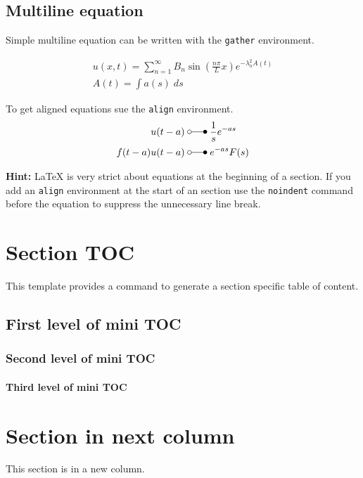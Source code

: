\documentclass[\fontheight]{extarticle}
\begin{document}
\begin{multicols*}{3}
    \subsection{Multiline equation}
    Simple multiline equation can be written with the \texttt{gather} environment.

    \begin{gather*}
        u(x,t) =\sum_{n=1}^\infty B_n\sin(\frac{n\pi}Lx)e^{-\lambda_n^2 A(t)} \\
        A(t)=\int a(s)\;ds
    \end{gather*}

    To get aligned equations sue the \texttt{align} environment.
    \begin{align*}
        u(t-a)       \; & \laplace\; \frac{1}{s}e^{-as} \\
        f(t-a)u(t-a) \; & \laplace\; e^{-as}F(s)
    \end{align*}

    \textbf{Hint:} \LaTeX{} is very strict about equations at the beginning of a section.
    If you add an \texttt{align} environment at the start of an section use the
    \texttt{noindent} command before the equation to suppress the unnecessary
    line break.

    \section{Section TOC}
    This template provides a command to generate a section specific table of content.
    \createsectiontoc{}

    \subsection{First level of mini TOC}
    \subsubsection{Second level of mini TOC}
    \paragraph{Third level of mini TOC}

    \newcol{}

    \section{Section in next column}
    This section is in a new column.


\end{multicols*}
\end{document}
